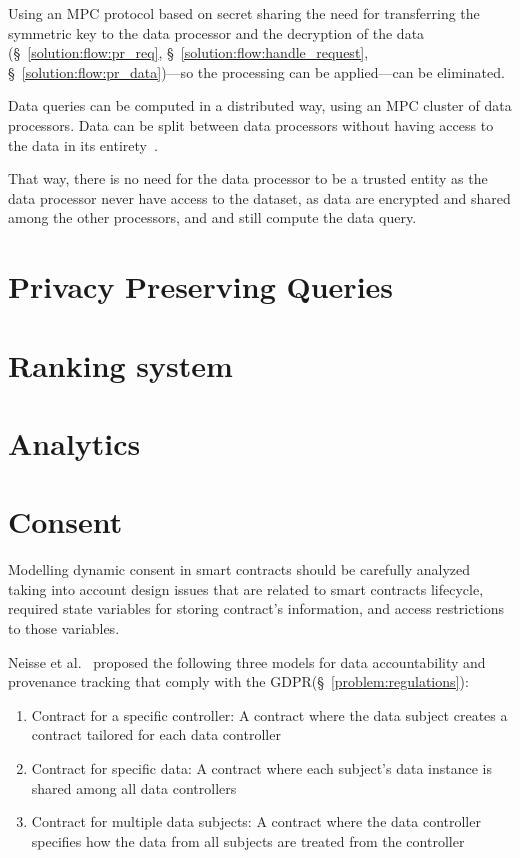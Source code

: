 Using an MPC protocol based on secret sharing the need for transferring the symmetric key to the data processor and the decryption of the data (§~\ref{solution:flow:pr_req}, §~\ref{solution:flow:handle_request}, §~\ref{solution:flow:pr_data})---so the processing can be applied---can be eliminated.

Data queries can be computed in a distributed way, using an MPC cluster of data processors. Data can be split between data processors without having access to the data in its entirety~\cite{DBLP:journals/corr/ZyskindNP15}.

That way, there is no need for the data processor to be a trusted entity as the data processor never have access to the dataset, as data are encrypted and shared among the other processors, and and still compute the data query.

\section{Privacy Preserving Queries}
\label{future_work:ppq}

\section{Ranking system}
\label{future_work:ranking_system}

\section{Analytics}
\label{future_work:analytics}

\section{Consent}
\label{future_work:consent}

Modelling dynamic consent in smart contracts should be carefully analyzed taking into account design issues that are related to smart contracts lifecycle, required state variables for storing contract’s information, and access restrictions to those variables.

Neisse et al.~\cite{DBLP:journals/corr/NeisseSF17} proposed the following three models for data accountability and provenance tracking that comply with the GDPR(§~\ref{problem:regulations}):

\begin{enumerate}
  \item Contract for a specific controller: A contract where the data subject creates a contract tailored for each data controller
  \item Contract for specific data: A contract where each subject’s data instance is shared among all data controllers
  \item Contract for multiple data subjects: A contract where the data controller specifies how the data from all subjects are treated from the controller
\end{enumerate}

